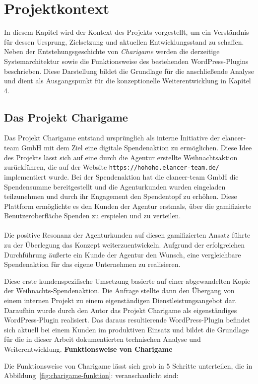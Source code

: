 \chapter{Projektkontext}
In diesem Kapitel wird der Kontext des Projekts vorgestellt, um ein Verständnis für dessen Ursprung, Zielsetzung und aktuellen Entwicklungsstand zu schaffen.
Neben der Entstehungsgeschichte von \textit{Charigame} werden die derzeitige Systemarchitektur sowie die Funktionsweise des bestehenden WordPress-Plugins beschrieben.
Diese Darstellung bildet die Grundlage für die anschließende Analyse und dient als Ausgangspunkt für die konzeptionelle Weiterentwicklung in Kapitel 4.
\section{Das Projekt Charigame}

Das Projekt Charigame entstand ursprünglich als interne Initiative der elancer-team GmbH mit dem Ziel eine digitale Spendenaktion zu ermöglichen.
Diese Idee des Projekts lässt sich auf eine durch die Agentur erstellte Weihnachtsaktion zurückführen, die auf der Website \texttt{https://hohoho.elancer-team.de/} implementiert wurde.
Bei der Spendenaktion hat die elancer-team GmbH die Spendensumme bereitgestellt und die Agenturkunden wurden eingeladen teilzunehmen und durch ihr Engagement den Spendentopf zu erhöhen.
Diese Plattform ermöglichte es den Kunden der Agentur erstmals, über die gamifizierte Benutzeroberfläche Spenden zu erspielen und zu verteilen.
\\\\
Die positive Resonanz der Agenturkunden auf diesen gamifizierten Ansatz führte zu der Überlegung das Konzept weiterzuentwickeln.
Aufgrund der erfolgreichen Durchführung äußerte ein Kunde der Agentur den Wunsch, eine vergleichbare Spendenaktion für das eigene Unternehmen zu realisieren.

Diese erste kundenspezifische Umsetzung basierte auf einer abgewandelten Kopie der Weihnachts-Spendenaktion.
Die Anfrage stellte dann den Übergang von einem internen Projekt zu einem eigenständigen Dienstleistungsangebot dar.
Daraufhin wurde durch den Autor das Projekt Charigame als eigenständiges WordPress-Plugin realisiert.
Das daraus resultierende WordPress-Plugin befindet sich aktuell bei einem Kunden im produktiven Einsatz und bildet die Grundlage für die in dieser Arbeit dokumentierten technischen Analyse und Weiterentwicklung.
\newpage
\textbf{Funktionsweise von Charigame}

Die Funktionsweise von Charigame lässt sich grob in 5 Schritte unterteilen, die in Abbildung~\ref{fig:charigame-funktion}: veranschaulicht sind:

